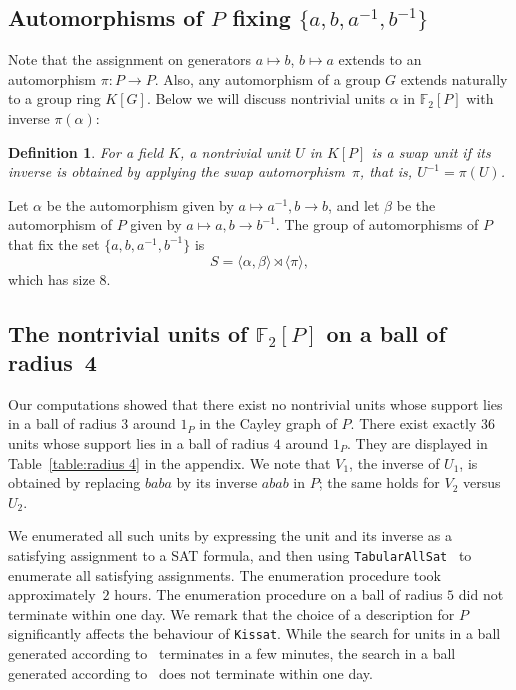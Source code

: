\documentclass[11pt]{amsart}
\newcommand\textcode[1]{{\footnotesize \rm\texttt{#1}}}
\theoremstyle{mythm}
\theoremstyle{mydef}
\newtheorem{definition}[theorem]{Definition}
\theoremstyle{myrem}
\numberwithin{equation}{section}
\newcommand{\la}{\langle}
\newcommand{\ra}{\rangle}
\begin{document}
 
 
 
 \subsection{Automorphisms of $P$ fixing $\{a, b, a^{-1}, b^{-1}\}$} \label{ss:automorphism P}  Note that  the assignment on generators $a \mapsto b$, $b \mapsto a$  extends to  an automorphism $\pi \colon P \to P$.  Also,  any  automorphism of a group $G$  extends naturally to a group ring $K[G]$. Below we will  discuss    nontrivial units $\alpha$  in $\mathbb F_2[P]$ with inverse $\pi(\alpha)$:
 \begin{definition}  \label{df:swap} For a field $K$,  a \textit{nontrivial} unit  $U$ in $K[P]$ is a \textit{swap unit}  if its inverse is obtained by applying the swap automorphism~$\pi$, that is, $U^{-1}= \pi(U)$.  \end{definition} Let $\alpha$ be the automorphism given by $a \mapsto a^{-1}, b \to b$, and  let $\beta $  be the automorphism of $P$ given by $a \mapsto a, b \to b^{-1}$. The group of automorphisms of $P$ that fix the set  $\{a, b, a^{-1}, b^{-1}\}$ is \begin{equation} \label{eqn:S} S=\la \alpha, \beta \ra \rtimes \la \pi \ra,\end{equation} 
  which has size $8$. 
 
 
 
 \subsection{The  nontrivial units of   $\mathbb{F}_2[P]$   on a ball of radius~4}
\label{ss:rad4}

 
  
  
 
  
  Our computations showed that  there exist no nontrivial units whose support lies in a ball of radius $3$ around
  $1_P$  in the Cayley graph of $P$. There exist exactly 36 units
  whose support lies in a ball of radius $4$ around $1_P$.  They are displayed in Table~\ref{table:radius 4} in the appendix.   We note  that $V_1$,  the inverse of  $U_1$, is obtained by replacing $baba$ by its inverse $abab$ in $P$; the same holds for $V_2$ versus $U_2$.  
  
  We enumerated all such
  units by expressing the unit and its inverse as a satisfying assignment to a SAT formula, and then using \textcode{TabularAllSat}~\cite{SpallittaBiereSebastiani2025,TabularAllSATCode} to enumerate all satisfying assignments. The
  enumeration procedure took approximately~$2$ hours. The enumeration
  procedure on a ball of radius $5$ did not terminate within one day.  We remark that the choice of a description for $P$ significantly
  affects the behaviour of \textcode{Kissat}. While the search for units
  in a ball generated according to~\cite{P} terminates in a few minutes,
  the search in a ball generated according to~\cite{G} does not terminate
  within one day.
  
\end{document}
